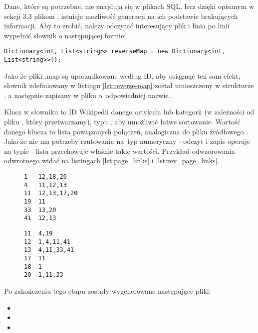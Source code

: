 Dane, które są potrzebne, nie znajdują się w plikach SQL, lecz dzięki opisanym w sekcji 3.3 plikom , istnieje możliwość generacji na ich podstawie brakujących informacji. Aby to zrobić, należy odczytać interesujący plik  i linia po linii wypełnić słownik o następującej formie:

\begin{lstlisting}[caption={Słownik przechowujący odwzorowanie odwrotne}, label=lst:reverse-map]
Dictionary<int, List<string>> reverseMap = new Dictionary<int, List<string>>();
\end{lstlisting}

Jako że pliki .map są uporządkowane według ID, aby osiągnąć ten sam efekt, słownik zdefiniowany w listingu \ref{lst:reverse-map} został umieszczony w strukturze , a następnie zapisany w pliku o~odpowiedniej nazwie. 

Klucz w słowniku to ID Wikipedii danego artykułu lub kategorii (w zależności od pliku , który przetwarzamy), typu , aby umożliwić łatwe sortowanie. Wartość danego klucza to lista powiązanych połączeń, analogiczna do pliku źródłowego . Jako że nie ma potrzeby rzutowania na~typ numeryczny - odczyt i zapis operuje na typie  - lista przechowuje właśnie takie wartości. Przykład odwzorowania odwrotnego widać na listingach \ref{lst:page_links} i \ref{lst:rev_page_links}.

\begin{figure}[!h]
\begin{center}
    \begin{minipage}[c]{0.45\linewidth}
        \begin{lstlisting}[frame=single,caption={Przykładowy fragment pliku \lstinline{pagelinks.map}},label=lst:page_links]
1   12,18,20
4   11,12,13
11  12,13,17,20
19  11
33  13,20
41  12,13
\end{lstlisting}
    \end{minipage}
    \hspace{1em}
    \begin{minipage}[c]{0.45\linewidth}
        \begin{lstlisting}[frame=single,caption={Odwzorowanie odwrotne z listingu \ref{lst:page_links} (fragment \lstinline{R\_pagelinks.map})},label=lst:rev_page_links]
11  4,19
12  1,4,11,41
13  4,11,33,41
17  11
18  1
20  1,11,33
\end{lstlisting}
\end{minipage}
\end{center}
\end{figure}
Po zakończeniu tego etapu zostały wygenerowane następujące pliki:
\begin{itemize}
    \setlength\itemsep{0.2em}
    \item {}
    \item {}
    \item {}
\end{itemize}

